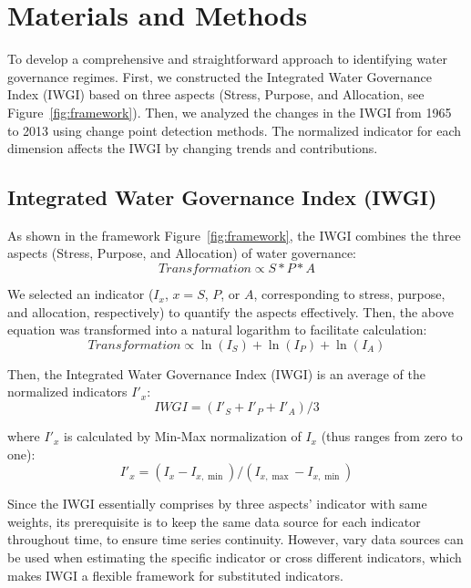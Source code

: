 \documentclass[draft]{../agujournal2019}
\begin{document}
\section{Materials and Methods}\label{sec11}


To develop a comprehensive and straightforward approach to identifying water governance regimes. First, we constructed the Integrated Water Governance Index (IWGI) based on three aspects (Stress, Purpose, and Allocation, see Figure~\ref{fig:framework}). Then, we analyzed the changes in the IWGI from 1965 to 2013 using change point detection methods. The normalized indicator for each dimension affects the IWGI by changing trends and contributions.

\subsection{Integrated Water Governance Index (IWGI)}

As shown in the framework Figure~\ref{fig:framework}, the IWGI combines the three aspects (Stress, Purpose, and Allocation) of water governance:
	\begin{equation}
		Transformation \propto S*P*A
	\end{equation}

	We selected an indicator ($I_x$, $x=S$, $P$, or $A$, corresponding to stress, purpose, and allocation, respectively) to quantify the aspects effectively. Then, the above equation was transformed into a natural logarithm to facilitate calculation:
	\begin{equation}
		Transformation \propto \ln(I_S) + \ln(I_P) + \ln(I_A)
	\end{equation}

	Then, the Integrated Water Governance Index (IWGI) is an average of the normalized indicators $I'_x$:
	\begin{equation}
		IWGI = (I'_S + I'_P + I'_A) / 3
	\end{equation}

	where $I'_x$ is calculated by Min-Max normalization of $I_x$ (thus ranges from zero to one):
	\begin{equation}
		I'_x = (I_x - I_{x, \min}) / (I_{x, \max} - I_{x, \min})
	\end{equation}

	Since the IWGI essentially comprises by three aspects' indicator with same weights, its prerequisite is to keep the same data source for each indicator throughout time, to ensure time series continuity.
	However, vary data sources can be used when estimating the specific indicator or cross different indicators, which makes IWGI a flexible framework for substituted indicators.
\end{document}
